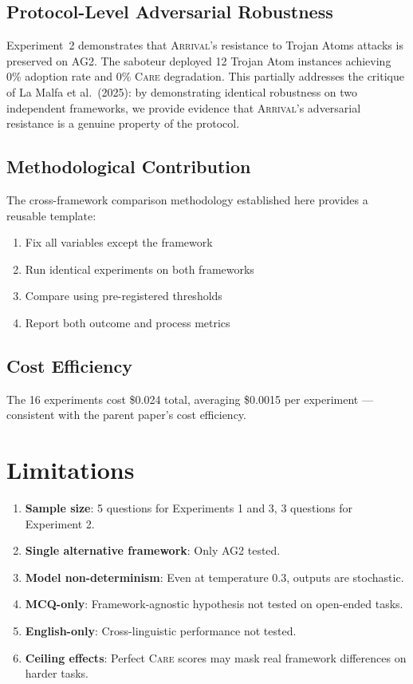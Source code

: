 \documentclass[11pt,a4paper]{article}
\newcommand{\arrival}{\textsc{Arrival}\xspace}
\newcommand{\care}{\textsc{Care}\xspace}
\begin{document}
\subsection{Protocol-Level Adversarial Robustness}

Experiment~2 demonstrates that \arrival's resistance to Trojan Atoms
attacks is preserved on AG2.  The saboteur deployed 12 Trojan Atom
instances achieving 0\% adoption rate and 0\% \care degradation.  This
partially addresses the critique of La Malfa et al.\ (2025): by
demonstrating identical robustness on two independent frameworks, we
provide evidence that \arrival's adversarial resistance is a genuine
property of the protocol.

\subsection{Methodological Contribution}

The cross-framework comparison methodology established here provides a
reusable template:
\begin{enumerate}
  \item Fix all variables except the framework
  \item Run identical experiments on both frameworks
  \item Compare using pre-registered thresholds
  \item Report both outcome and process metrics
\end{enumerate}

\subsection{Cost Efficiency}

The 16 experiments cost \$0.024 total, averaging \$0.0015 per
experiment --- consistent with the parent paper's cost efficiency.

\section{Limitations}\label{sec:limitations}

\begin{enumerate}
  \item \textbf{Sample size}: 5 questions for Experiments 1 and 3,
    3 questions for Experiment 2.
  \item \textbf{Single alternative framework}: Only AG2 tested.
  \item \textbf{Model non-determinism}: Even at temperature 0.3,
    outputs are stochastic.
  \item \textbf{MCQ-only}: Framework-agnostic hypothesis not tested
    on open-ended tasks.
  \item \textbf{English-only}: Cross-linguistic performance not tested.
  \item \textbf{Ceiling effects}: Perfect \care scores may mask real
    framework differences on harder tasks.
\end{enumerate}
\end{document}
